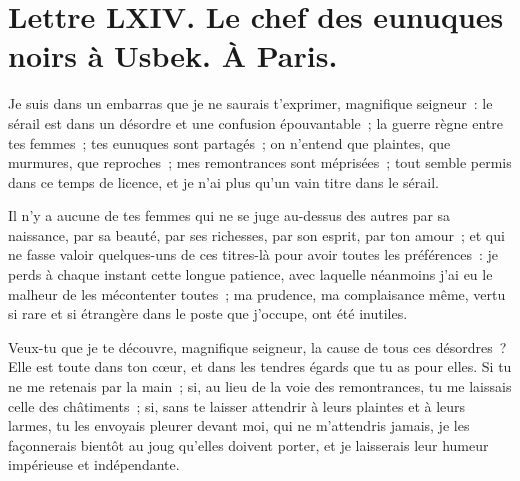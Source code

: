 \documentclass[french,twoside]{book} %
\newcommand{\dateline}[1]{\medskip{\RaggedLeft{#1}\par}\bigskip}
\begin{document}
\dateline{À Paris, le 10 de la lune de Rebiab, 1714.}
\section[{Lettre LXIV. Le chef des eunuques noirs à Usbek. À Paris.}]{Lettre LXIV. Le chef des eunuques noirs à Usbek. À Paris.}\renewcommand{\leftmark}{Lettre LXIV. Le chef des eunuques noirs à Usbek. À Paris.}

\noindent Je suis dans un embarras que je ne saurais t’exprimer, magnifique seigneur : le sérail est dans un désordre et une confusion épouvantable ; la guerre règne entre tes femmes ; tes eunuques sont partagés ; on n’entend que plaintes, que murmures, que reproches ; mes remontrances sont méprisées ; tout semble permis dans ce temps de licence, et je n’ai plus qu’un vain titre dans le sérail.\par
Il n’y a aucune de tes femmes qui ne se juge au-dessus des autres par sa naissance, par sa beauté, par ses richesses, par son esprit, par ton amour ; et qui ne fasse valoir quelques-uns de ces titres-là pour avoir toutes les préférences : je perds à chaque instant cette longue patience, avec laquelle néanmoins j’ai eu le malheur de les mécontenter toutes ; ma prudence, ma complaisance même, vertu si rare et si étrangère dans le poste que j’occupe, ont été inutiles.\par
Veux-tu que je te découvre, magnifique seigneur, la cause de tous ces désordres ? Elle est toute dans ton cœur, et dans les tendres égards que tu as pour elles. Si tu ne me retenais par la main ; si, au lieu de la voie des remontrances, tu me laissais celle des châtiments ; si, sans te laisser attendrir à leurs plaintes et à leurs larmes, tu les envoyais pleurer devant moi, qui ne m’attendris jamais, je les façonnerais bientôt au joug qu’elles doivent porter, et je laisserais leur humeur impérieuse et indépendante.\par
\end{document}
